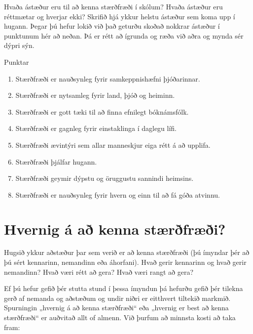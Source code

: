 \documentclass[
  icelandic,
]{book}
\providecommand{\tightlist}{%
  \setlength{\itemsep}{0pt}\setlength{\parskip}{0pt}}
\theoremstyle{definition}
\theoremstyle{definition}
\theoremstyle{definition}
\theoremstyle{definition}
\theoremstyle{remark}
\begin{document}
Hvaða ástæður eru til að kenna stærðfræði í skólum? Hvaða ástæður eru réttmætar og hverjar ekki? Skrifið hjá ykkur helstu ástæður sem koma upp í hugann. Þegar þú hefur lokið við það geturðu skoðað nokkrar ástæður í punktunum hér að neðan. Þá er rétt að ígrunda og ræða við aðra og mynda sér dýpri sýn.

Punktar

\begin{enumerate}
\def\labelenumi{\alph{enumi}.}
\tightlist
\item
  Stærðfræði er nauðsynleg fyrir samkeppnishæfni þjóðarinnar.
\item
  Stærðfræði er nytsamleg fyrir land, þjóð og heiminn.
\item
  Stærðfræði er gott tæki til að finna efnilegt bóknámsfólk.
\item
  Stærðfræði er gagnleg fyrir einstaklinga í daglegu lífi.
\item
  Stærðfræði ævintýri sem allar manneskjur eiga rétt á að upplifa.
\item
  Stærðfræði þjálfar hugann.
\item
  Stærðfræði geymir dýpstu og öruggustu sannindi heimsins.
\item
  Stærðfræði er nauðsynleg fyrir hvern og einn til að fá góða atvinnu.
\end{enumerate}

\section{Hvernig á að kenna stærðfræði?}\label{hvernig-stae}

Hugsið ykkur aðstæður þar sem verið er að kenna stærðfræði (þú ímyndar þér að þú sért kennarinn, nemandinn eða áhorfani). Hvað gerir kennarinn og hvað gerir nemandinn? Hvað væri rétt að gera? Hvað væri rangt að gera?

Ef þú hefur gefið þér stutta stund í þessa ímyndun þá hefurðu gefið þér tilekna gerð af nemanda og aðstæðum og undir niðri er eitthvert tiltekið markmið. Spurningin „hvernig á að kenna stærðfræði`` eða „hvernig er best að kenna stærðfræði`` er auðvitað allt of almenn. Við þurfum að minnsta kosti að taka fram:
\end{document}
